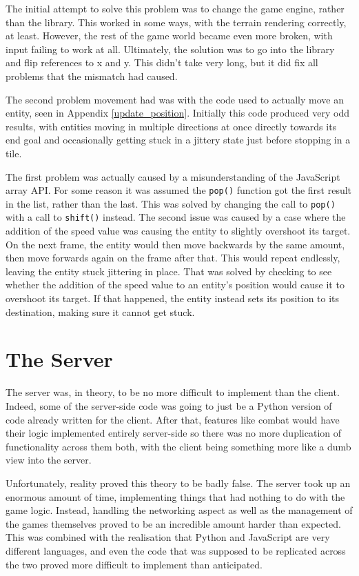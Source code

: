 The initial attempt to solve this problem was to change the game engine, rather than the library. This worked in some ways, with the terrain rendering correctly, at least. However, the rest of the game world became even more broken, with input failing to work at all. Ultimately, the solution was to go into the library and flip references to x and y. This didn't take very long, but it did fix all problems that the mismatch had caused.

The second problem movement had was with the code used to actually move an entity, seen in Appendix \ref{update_position}. Initially this code produced very odd results, with entities moving in multiple directions at once directly towards its end goal and occasionally getting stuck in a jittery state just before stopping in a tile.

The first problem was actually caused by a misunderstanding of the JavaScript array API. For some reason it was assumed the \texttt{pop()} function got the first result in the list, rather than the last. This was solved by changing the call to \texttt{pop()} with a call to \texttt{shift()} instead. The second issue was caused by a case where the addition of the speed value was causing the entity to slightly overshoot its target. On the next frame, the entity would then move backwards by the same amount, then move forwards again on the frame after that. This would repeat endlessly, leaving the entity stuck jittering in place. That was solved by checking to see whether the addition of the speed value to an entity's position would cause it to overshoot its target. If that happened, the entity instead sets its position to its destination, making sure it cannot get stuck.

\section{The Server}\label{server_implementation}
The server was, in theory, to be no more difficult to implement than the client. Indeed, some of the server-side code was going to just be a Python version of code already written for the client. After that, features like combat would have their logic implemented entirely server-side so there was no more duplication of functionality across them both, with the client being something more like a dumb view into the server.

Unfortunately, reality proved this theory to be badly false. The server took up an enormous amount of time, implementing things that had nothing to do with the game logic. Instead, handling the networking aspect as well as the management of the games themselves proved to be an incredible amount harder than expected. This was combined with the realisation that Python and JavaScript are very different languages, and even the code that was supposed to be replicated across the two proved more difficult to implement than anticipated.

